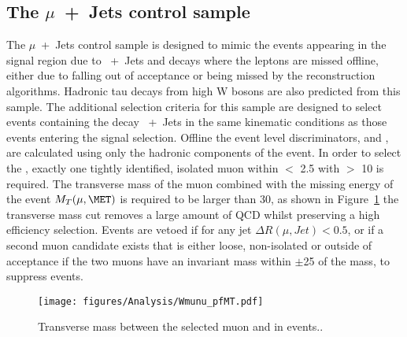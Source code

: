 \subsection{The $\mu$~+~Jets control sample} %
\label{par:the_mu_jets_control_sample}
The $\mu$~+~Jets control sample is designed to mimic the events appearing in 
the signal region due to \HepProcess{\PW}~+~Jets and \HepProcess{\Ptop\APtop} 
decays where the leptons are missed offline, either due to falling out of 
acceptance or being missed by the reconstruction algorithms. Hadronic tau 
decays from high \PT W bosons are also predicted from this sample.
The additional selection criteria for this sample are designed to select events 
containing the decay \HepProcess{\PW\to\mu\nu}~+~Jets in the same kinematic 
conditions as those events entering the signal selection. Offline the event 
level discriminators, \HT and \alt, are calculated using only the hadronic 
components of the event. In order to select the \HepProcess{\PW}, exactly one 
tightly identified, isolated muon within \mETA $<$ 2.5 with \PT $>$ 
\unit{10}{\GeV} is required. The transverse mass of the muon combined with the 
missing energy of the event $M_{T}(\mu,\MET)$ is required to be larger than 
\unit{30}{\GeV}, as shown in Figure~\ref{fig:figures_Analysis_Wmunu_pfMT} the 
transverse mass cut removes a large amount of QCD whilst preserving a high 
efficiency \HepProcess{\PW} selection. Events are vetoed if for any jet $\Delta 
R(\mu,Jet) < 0.5$, or if a second muon candidate exists that is either loose, 
non-isolated or outside of acceptance if the two muons have an invariant mass 
within $\pm$\unit{25}{\GeV} of the \PZ mass, to suppress 
\HepProcess{\PZ\to\mu\mu} events.


\begin{figure}[htbp]
  \centering
    \texttt{[image: figures/Analysis/Wmunu\_pfMT.pdf]}
  \caption{Transverse mass between the selected muon and \MET in 
           \HepProcess{\PW\to\mu\nu} events.\cite{CMS-AN-10-264}.}
  \label{fig:figures_Analysis_Wmunu_pfMT}
\end{figure}


